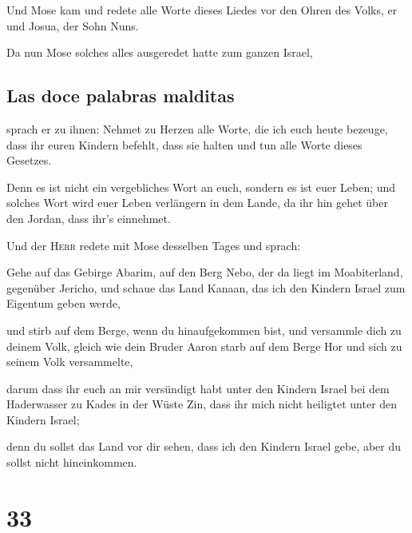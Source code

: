  Und Mose kam und redete alle Worte dieses Liedes vor den
Ohren des Volks, er und Josua, der Sohn Nuns.

 Da nun Mose solches alles ausgeredet hatte zum ganzen
Israel,

\hypertarget{las-doce-palabras-malditas}{%
\subsection{Las doce palabras
malditas}\label{las-doce-palabras-malditas}}

 sprach er zu ihnen: Nehmet zu Herzen alle Worte, die ich
euch heute bezeuge, dass ihr euren Kindern befehlt, dass sie halten und
tun alle Worte dieses Gesetzes.

 Denn es ist nicht ein vergebliches Wort an euch, sondern
es ist euer Leben; und solches Wort wird euer Leben verlängern in dem
Lande, da ihr hin gehet über den Jordan, dass ihr's einnehmet.

 Und der \textsc{Herr} redete mit Mose desselben Tages
und sprach:

 Gehe auf das Gebirge Abarim, auf den Berg Nebo, der da
liegt im Moabiterland, gegenüber Jericho, und schaue das Land Kanaan,
das ich den Kindern Israel zum Eigentum geben werde,

 und stirb auf dem Berge, wenn du hinaufgekommen bist,
und versammle dich zu deinem Volk, gleich wie dein Bruder Aaron starb
auf dem Berge Hor und sich zu seinem Volk versammelte,

 darum dass ihr euch an mir versündigt habt unter den
Kindern Israel bei dem Haderwasser zu Kades in der Wüste Zin, dass ihr
mich nicht heiligtet unter den Kindern Israel;

 denn du sollst das Land vor dir sehen, dass ich den
Kindern Israel gebe, aber du sollst nicht hineinkommen.

\hypertarget{section-32}{%
\section{33}\label{section-32}}


